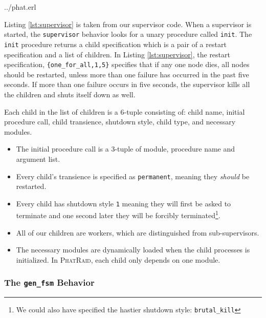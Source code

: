 \documentclass[10pt,letter]{article}
\newcommand{\phatraid}[0]{\textsc{PhatRaid}}
\begin{document}

                {../phat.erl}

Listing \ref{lst:supervisor} is taken from our supervisor code. When a
supervisor is started, the \texttt{supervisor} behavior looks for a unary
procedure called \lstinline!init!. The \lstinline!init! procedure returns a
child specification which is a pair of a restart specification and a list of
children. In Listing \ref{lst:supervisor}, the restart specification,
\lstinline!{one_for_all,1,5}! specifies that if any one node dies, all nodes
should be restarted, unless more than one failure has occurred in the past five
seconds. If more than one failure occurs in five seconds, the supervisor kills
all the children and shuts itself down as well.

Each child in the list of children is a 6-tuple consisting of: child name,
initial procedure call, child transience, shutdown style, child type, and
necessary modules.

\begin{itemize}
\item The initial procedure call is a 3-tuple of module, procedure name and
  argument list.
\item Every child's transience is specified as \lstinline!permanent!, meaning
  they \emph{should} be restarted.
\item Every child has shutdown style \lstinline!1! meaning they will first be
  asked to terminate and one second later they will be forcibly
  terminated\footnote{We could also have specified the hastier shutdown style:
    \lstinline!brutal_kill!}.
\item All of our children are workers, which are distinguished from
  sub-supervisors.
\item The necessary modules are dynamically loaded when the child processes is
  initialized. In \phatraid{}, each child only depends on one module.
\end{itemize}

\subsubsection{The \texttt{gen\_fsm} Behavior}
\end{document}
